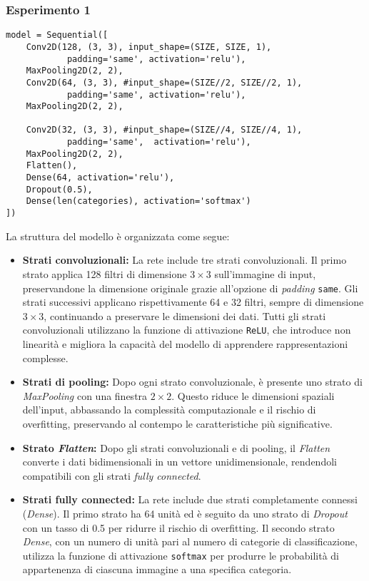\subsubsection{Esperimento 1}
\begin{lstlisting}[caption={Primo modello di CNN creato},captionpos=b]
model = Sequential([
    Conv2D(128, (3, 3), input_shape=(SIZE, SIZE, 1),
            padding='same', activation='relu'),
    MaxPooling2D(2, 2),
    Conv2D(64, (3, 3), #input_shape=(SIZE//2, SIZE//2, 1),
            padding='same', activation='relu'),
    MaxPooling2D(2, 2),

    Conv2D(32, (3, 3), #input_shape=(SIZE//4, SIZE//4, 1),
            padding='same',  activation='relu'),
    MaxPooling2D(2, 2),
    Flatten(),
    Dense(64, activation='relu'),
    Dropout(0.5),
    Dense(len(categories), activation='softmax')
])
\end{lstlisting}
La struttura del modello è organizzata come segue:
\begin{itemize}
    \item \textbf{Strati convoluzionali:} La rete include tre strati convoluzionali. 
    Il primo strato applica 128 filtri di dimensione $3 \times 3$ sull'immagine di input, preservandone la dimensione originale grazie all'opzione di \textit{padding} \texttt{same}. 
    Gli strati successivi applicano rispettivamente 64 e 32 filtri, sempre di dimensione $3 \times 3$, continuando a preservare le dimensioni dei dati. 
    Tutti gli strati convoluzionali utilizzano la funzione di attivazione \texttt{ReLU}, che introduce non linearità e migliora la capacità del modello di apprendere rappresentazioni complesse.

    \item \textbf{Strati di pooling:} Dopo ogni strato convoluzionale, è presente uno strato di \textit{MaxPooling} con una finestra $2 \times 2$. 
    Questo riduce le dimensioni spaziali dell'input, abbassando la complessità computazionale e il rischio di overfitting, preservando al contempo le caratteristiche più significative.

    \item \textbf{Strato \textit{Flatten}:} Dopo gli strati convoluzionali e di pooling, il \textit{Flatten} converte i dati bidimensionali in un vettore unidimensionale, rendendoli compatibili con gli strati \textit{fully connected}.

    \item \textbf{Strati fully connected:} La rete include due strati completamente connessi (\textit{Dense}). 
    Il primo strato ha 64 unità ed è seguito da uno strato di \textit{Dropout} con un tasso di 0.5 per ridurre il rischio di overfitting. 
    Il secondo strato \textit{Dense}, con un numero di unità pari al numero di categorie di classificazione, utilizza la funzione di attivazione \texttt{softmax} per produrre le probabilità di appartenenza di ciascuna immagine a una specifica categoria.
\end{itemize}
